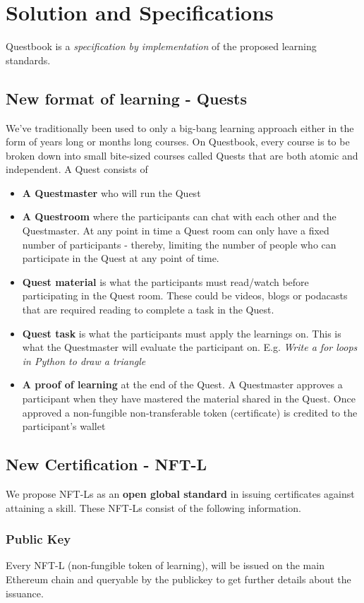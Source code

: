 \documentclass{article}
\begin{document}
  \section{Solution and Specifications}
    Questbook is a \textit{specification by implementation} of the proposed learning standards.
    \subsection{New format of learning - Quests}
      We've traditionally been used to only a big-bang learning approach either in the form of years long or months long courses.
      On Questbook, every course is to be broken down into small bite-sized courses called Quests that are both atomic and independent.
      A Quest consists of 
      \begin{itemize}
        \item \textbf{A Questmaster} who will run the Quest
        \item \textbf{A Questroom} where the participants can chat with each other and the Questmaster. At any point in time a Quest room can only have  a fixed number of participants - thereby, limiting the number of people who can participate in the Quest at any point of time.
        \item \textbf{Quest material} is what the participants must read/watch before participating in the Quest room. These could be videos, blogs or podacasts that are required reading to complete a task in the Quest.
        \item \textbf{Quest task} is what the participants must apply the learnings on. This is what the Questmaster will evaluate the participant on. E.g. \textit{Write a for loops in Python to draw a triangle}
        \item \textbf{A proof of learning} at the end of the Quest. A Questmaster approves a participant when they have mastered the material shared in the Quest. Once approved a non-fungible non-transferable token (certificate) is credited to the participant's wallet
      \end{itemize}
    \subsection{New Certification - NFT-L}
      We propose NFT-Ls as an \textbf{open global standard} in issuing certificates against attaining a skill. These NFT-Ls consist of the following information.
      \subsubsection{Public Key}
        Every NFT-L (non-fungible token of learning), will be issued on the main Ethereum chain and queryable by the publickey to get further details about the issuance.
\end{document}
